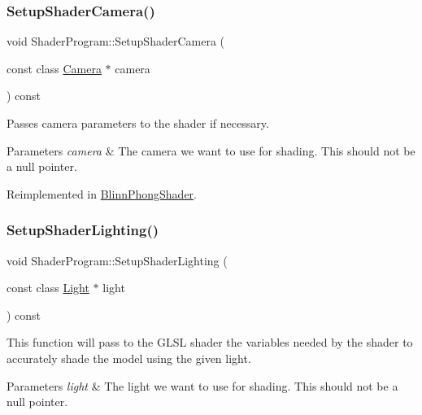 \subsubsection{\texorpdfstring{Setup\+Shader\+Camera()}{SetupShaderCamera()}}
{\footnotesize\ttfamily void Shader\+Program\+::\+Setup\+Shader\+Camera (\begin{DoxyParamCaption}\item[{const class \hyperlink{class_camera}{Camera} $\ast$}]{camera }\end{DoxyParamCaption}) const\hspace{0.3cm}{\ttfamily [virtual]}}



Passes camera parameters to the shader if necessary.


\begin{DoxyParams}{Parameters}
{\em camera} & The camera we want to use for shading. This should not be a null pointer. \\
\hline
\end{DoxyParams}


Reimplemented in \hyperlink{class_blinn_phong_shader_ab4d435ed4f4815a71590b514550dc2b7}{Blinn\+Phong\+Shader}.

\hypertarget{class_shader_program_a02cf3df43c59808160fce158ad655a40}{}\label{class_shader_program_a02cf3df43c59808160fce158ad655a40}
\subsubsection{\texorpdfstring{Setup\+Shader\+Lighting()}{SetupShaderLighting()}}
{\footnotesize\ttfamily void Shader\+Program\+::\+Setup\+Shader\+Lighting (\begin{DoxyParamCaption}\item[{const class \hyperlink{class_light}{Light} $\ast$}]{light }\end{DoxyParamCaption}) const\hspace{0.3cm}{\ttfamily [virtual]}}



This function will pass to the G\+L\+SL shader the variables needed by the shader to accurately shade the model using the given light.


\begin{DoxyParams}{Parameters}
{\em light} & The light we want to use for shading. This should not be a null pointer. \\
\hline
\end{DoxyParams}


